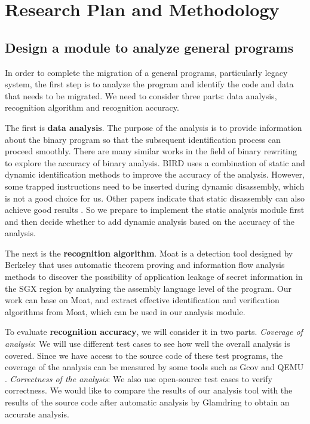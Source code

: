 \section{Research Plan and Methodology}
\subsection{Design a module to analyze general programs}
\label{sec:ToolToAnalyze}
In order to complete the migration of a general programs, particularly legacy system,
the first step is to analyze the program and identify the code and data that needs to
be migrated. We need to consider three parts: data analysis, recognition algorithm
and recognition accuracy.

The first is \textbf{data analysis}. The purpose of the analysis is to provide
information about the binary program so that the subsequent identification process
can proceed smoothly.
There are many similar works in the field of binary rewriting to explore
the accuracy of binary analysis.
BIRD \cite{Nanda2006BIRDBI} uses a combination of static and dynamic identification
methods to improve the accuracy of the analysis. However, some trapped instructions
need to be inserted during dynamic disassembly, which is not a good choice for us.
Other papers indicate that static disassembly can also achieve good results
\cite{Andriesse2016AnIA}. So we prepare to implement the static analysis module first
and then decide whether to add dynamic analysis based on the accuracy of the analysis.

The next is the \textbf{recognition algorithm}.
Moat \cite{Sinha2015MoatVC} is a detection tool designed by Berkeley that uses
automatic theorem proving and information flow analysis methods to discover the
possibility of application leakage of secret information in the SGX region by
analyzing the assembly language level of the program.
Our work can base on Moat, and extract effective identification and verification
algorithms from Moat, which can be used in our analysis module.

To evaluate \textbf{recognition accuracy}, we will consider it in two parts.
\textit{Coverage of analysis}:
We will use different test cases to see how well the overall analysis is covered.
Since we have access to the source code of these test programs,
the coverage of the analysis can be measured by some tools such as Gcov \cite{GCOV}
and QEMU \cite{Bellard2005QEMUAF}.
\textit{Correctness of the analysis}:
We also use open-source test cases to verify correctness.
We would like to compare the results of our analysis tool with the results of the
source code after automatic analysis by Glamdring \cite{Lind2017GlamdringAA} to obtain
an accurate analysis.

